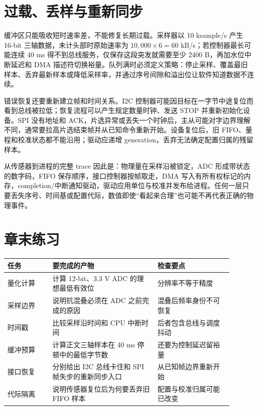 \section{过载、丢样与重新同步}

缓冲区只能吸收短时速率差，不能修复长期过载。采样器以 10 ksample/s 产生 16-bit 三轴数据，未计头部时原始速率为 $10{,}000\times6=60$ kB/s；若控制器最长可能连续 40 ms 得不到总线服务，仅保存这段突发就需要至少 2400 B，再加水位中断延迟和 DMA 描述符切换裕量。队列满时必须定义策略：停止采样、覆盖最旧样本、丢弃最新样本或降低采样率，并通过序号间隙和溢出位让软件知道数据不连续。

错误恢复还要重新建立帧和时间关系。I2C 控制器可能因目标在一字节中途复位而看到总线被拉低；恢复流程可以产生规定数量时钟、发送 STOP 并重新初始化设备。SPI 没有地址和 ACK，片选异常或丢失一个时钟后，主从可能对字边界理解不同，通常要拉高片选结束帧并从已知命令重新开始。设备复位后，旧 FIFO、量程和校准状态都不能沿用；驱动应递增 generation，丢弃无法确定配置归属的残留样本。

从传感器到进程的完整 trace 因此是：物理量在采样沿被锁定，ADC 形成带状态的数字码，FIFO 保存顺序，接口控制器按帧取走，DMA 写入有所有权标记的内存，completion/中断通知驱动，驱动应用单位与校准并发布给进程。任何一层只要丢失序号、时间基或配置代际，数值即使“看起来合理”也可能不再代表正确的物理事件。

\section*{章末练习}

\begin{longtable}{L{0.18\linewidth}L{0.42\linewidth}L{0.30\linewidth}}
\toprule
任务 & 要完成的产物 & 检查要点 \\
\midrule
量化计算 & 计算 12-bit、3.3 V ADC 的理想最低有效位 & 分辨率不等于精度 \\
采样边界 & 说明抗混叠必须在 ADC 之前完成的原因 & 混叠后频率身份不可恢复 \\
时间戳 & 比较采样沿时间和 CPU 中断时间 & 后者包含总线与调度抖动 \\
缓冲预算 & 计算正文三轴样本在 40 ms 停顿中的最低字节数 & 还要为控制延迟留裕量 \\
接口恢复 & 分别给出 I2C 总线卡住和 SPI 帧失步的重新同步入口 & 从已知帧边界重新开始 \\
代际隔离 & 说明传感器复位后为何要丢弃旧 FIFO 样本 & 配置与校准归属可能已改变 \\
\bottomrule
\end{longtable}

